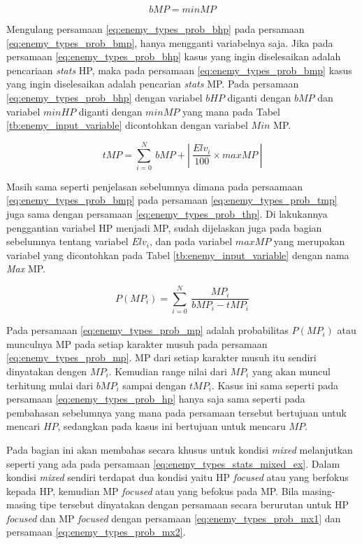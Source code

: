 \begin{equation}\label{eq:enemy_types_prob_bmp}
bMP = minMP
\end{equation}

Mengulang persamaan \ref{eq:enemy_types_prob_bhp} pada persamaan \ref{eq:enemy_types_prob_bmp}, hanya mengganti variabelnya saja. Jika pada persamaan \ref{eq:enemy_types_prob_bhp} kasus yang ingin diselesaikan adalah pencariaan \textit{stats} HP, maka pada persamaan \ref{eq:enemy_types_prob_bmp} kasus yang ingin diselesaikan adalah pencarian \textit{stats} MP. Pada persamaan \ref{eq:enemy_types_prob_bhp} dengan variabel $bHP$ diganti dengan $bMP$ dan variabel $minHP$ diganti dengan $minMP$ yang mana pada Tabel \ref{tb:enemy_input_variable} dicontohkan dengan variabel $Min$ MP.
\vspace{1ex}

\begin{equation}\label{eq:enemy_types_prob_tmp}
tMP = \sum_{i=0}^{N}\ bMP + \left |\ \frac{Elv_{i}}{100} \times maxMP\ \right |
\end{equation}

Masih sama seperti penjelasan sebelumnya dimana pada persaamaan \ref{eq:enemy_types_prob_bmp} pada persamaan \ref{eq:enemy_types_prob_tmp} juga sama dengan persamaan \ref{eq:enemy_types_prob_thp}. Di lakukannya penggantian variabel HP menjadi MP, sudah dijelaskan juga pada bagian sebelumnya tentang variabel $Elv_{i}$, dan pada variabel $maxMP$ yang merupakan variabel yang dicontohkan pada Tabel \ref{tb:enemy_input_variable} dengan nama \textit{Max} MP.

\begin{equation}\label{eq:enemy_types_prob_mp}
P(MP_{i}) = \sum_{i=0}^{N}\ \frac{MP_{i}}{bMP_{i} - tMP_{i}}
\end{equation}

Pada persamaan \ref{eq:enemy_types_prob_mp} adalah probabilitas $P(MP_{i})$ atau munculnya MP pada setiap karakter musuh pada persamaan \ref{eq:enemy_types_prob_mp}. MP dari setiap karakter musuh itu sendiri dinyatakan dengen $MP_{i}$. Kemudian range nilai dari $MP_{i}$ yang akan muncul terhitung mulai dari $bMP_{i}$ sampai dengan $tMP_{i}$. Kasus ini sama seperti pada persamaan \ref{eq:enemy_types_prob_hp} hanya saja sama seperti pada pembahasan sebelumnya yang mana pada persamaan tersebut bertujuan untuk mencari $HP$, sedangkan pada kasus ini bertujuan untuk mencaru $MP$.
\vspace{1ex}

Pada bagian ini akan membahas secara khusus untuk kondisi \textit{mixed} melanjutkan seperti yang ada pada persamaan \ref{eq:enemy_types_stats_mixed_ex}. Dalam kondisi \textit{mixed} sendiri terdapat dua kondisi yaitu HP \textit{focused} atau yang berfokus kepada HP, kemudian MP \textit{focused} atau yang befokus pada MP. Bila masing-masing tipe tersebut dinyatakan dengan persamaan secara berurutan untuk HP \textit{focused} dan MP \textit{focused} dengan persamaan \ref{eq:enemy_types_prob_mx1} dan persamaan \ref{eq:enemy_types_prob_mx2}. 


